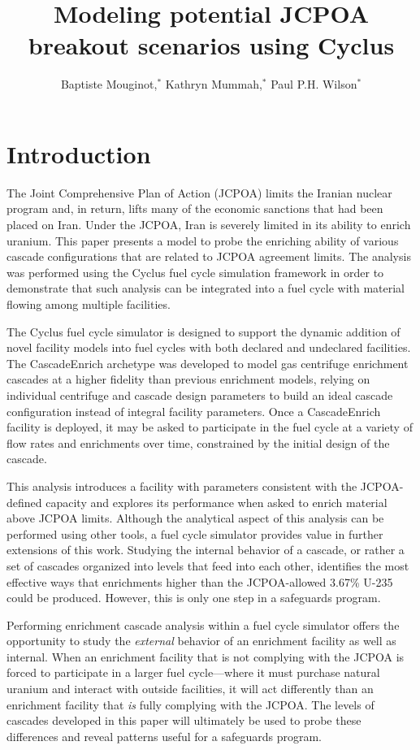 \documentclass{anstrans}
\title{Modeling potential JCPOA breakout scenarios using Cyclus}
\author{Baptiste Mouginot,$^{*}$ Kathryn Mummah,$^{*}$ Paul P.H. Wilson$^{*}$}
\institute{
$^{*}$University of Wisconsin-Madison, WI
}
\begin{document}
\section{Introduction}

The Joint Comprehensive Plan of Action (JCPOA)\cite{jcpoa} %
limits the Iranian nuclear program and, in return, lifts many of the economic
sanctions that had been placed on Iran. Under the JCPOA, Iran is severely
limited in its ability to enrich uranium. This paper presents a model to probe
the enriching ability of various cascade configurations that are related to
JCPOA agreement limits. The analysis was performed using the Cyclus fuel cycle
\cite{cyclus} %
simulation framework in order to demonstrate that such analysis can be
integrated into a fuel cycle with material flowing among multiple facilities.

The Cyclus fuel cycle simulator is designed to support the dynamic addition of
novel facility models into fuel cycles with both declared and undeclared facilities.
The CascadeEnrich archetype\cite{mbmore.2018} was developed to model gas centrifuge
enrichment cascades at a higher fidelity than previous enrichment models,
relying on individual centrifuge and cascade design parameters to build an ideal
cascade configuration instead of integral facility parameters. Once a
CascadeEnrich facility is deployed, it may be asked to participate in the fuel
cycle at a variety of flow rates and enrichments over time, constrained by the
initial design of the cascade.

This analysis introduces a facility with parameters consistent with the
JCPOA-defined capacity and explores its performance when asked to enrich
material above JCPOA limits. Although the analytical aspect of this analysis can
be performed using other tools, a fuel cycle simulator provides value in further
extensions of this work. Studying the internal behavior of a cascade, or rather
a set of cascades organized into levels that feed into each other, identifies
the most effective ways that enrichments higher than the JCPOA-allowed 3.67\%
U-235 could be produced. However, this is only one step in a safeguards program.

Performing enrichment cascade analysis within a fuel cycle simulator offers the
opportunity to study the \textit{external} behavior of an enrichment facility as
well as internal. When an enrichment facility that is not complying with the
JCPOA is forced to participate in a larger fuel cycle---where it must purchase
natural uranium and interact with outside facilities, it will act differently
than an enrichment facility that \textit{is} fully complying with the JCPOA. The
levels of cascades developed in this paper will ultimately be used to probe
these differences and reveal patterns useful for a safeguards program.
\end{document}
